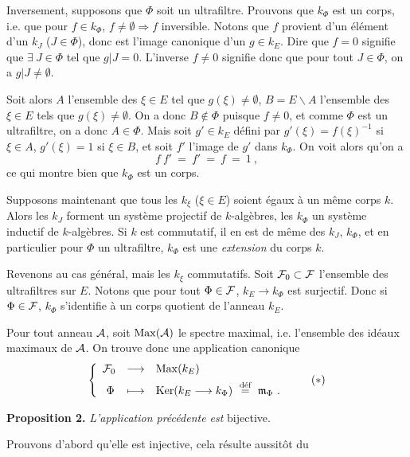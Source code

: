 \noindent Inversement, supposons que $\Phi$ soit un ultrafiltre. Prouvons que $k_\Phi$ est un corps, i.e. que pour $f\in k_\Phi$, $f\neq\emptyset\Longrightarrow f$ inversible. Notons que $f$ provient d'un élément d'un $k_J$ ($J\in\Phi$), donc est l'image canonique d'un $g\in k_E$. Dire que $f=0$ signifie que $\exists\ J\in\Phi$ tel que $g|J=0$. L'inverse $f\neq0$ signifie donc que pour tout $J\in\Phi$, on a $g|J\neq\emptyset$.

\noindent Soit alors $A$ l'ensemble des $\xi\in E$ tel que $g(\xi)\neq\emptyset$, $B=E\backslash A$ l'ensemble des $\xi\in E$ tels que $g(\xi)\neq\emptyset$. On a donc $B\notin\Phi$ puisque $f\neq0$, et comme $\Phi$ est un ultrafiltre, on a donc $A\in\Phi$. Mais soit $g'\in k_E$ défini par $g'(\xi)=f(\xi)^{-1}$ si $\xi\in A$, $g'(\xi)=1$ si $\xi\in B$, et soit $f'$ l'image de $g'$ dans $k_\Phi$. On voit alors qu'on a %
\[
f\ f' \ = \ f' \ = \ f \ = \ 1 \ ,
\]
ce qui montre bien que $k_\Phi$ est un corps.

\noindent Supposons maintenant que tous les $k_\xi$ ($\xi\in E$) soient égaux à un même corps $k$. Alors les $k_J$ forment un système projectif de $k$-algèbres, les $k_\Phi$ un système inductif de $k$-algèbres. Si $k$ est commutatif, il en est de même des $k_J$, $k_\Phi$, et en particulier pour $\Phi$ un ultrafiltre, $k_\Phi$ est une \textit{extension} du corps $k$.

\noindent Revenons au cas général, mais les $k_\xi$ commutatifs. Soit $\cF_0\subset\cF$ l'ensemble des ultrafiltres sur $E$. Notons que pour tout $\Phi\in\cF$, $k_E\longrightarrow k_\Phi$ est surjectif. Donc si $\Phi\in\cF$, $k_\Phi$ s'identifie à un corps quotient de l'anneau $k_E$.


\noindent Pour tout anneau $\cA$, soit $\Max(\cA)$ le spectre maximal, i.e. l'ensemble des idéaux maximaux de $\cA$. On trouve donc une application canonique
\[
\left\{
\begin{array}{lll}
\cF_0 & \longrightarrow & \Max(k_E)\\[1ex]
\ \Phi & \longmapsto & \Ker(k_E\longrightarrow k_\Phi) \ \defeq \ \mathfrak{m}_\Phi \ .
\end{array}\right. \tag*{$(*)$}
\]

\noindent\textbf{Proposition 2.} \textit{L'application précédente est} bijective.

\noindent Prouvons d'abord qu'elle est injective, cela résulte aussitôt du

